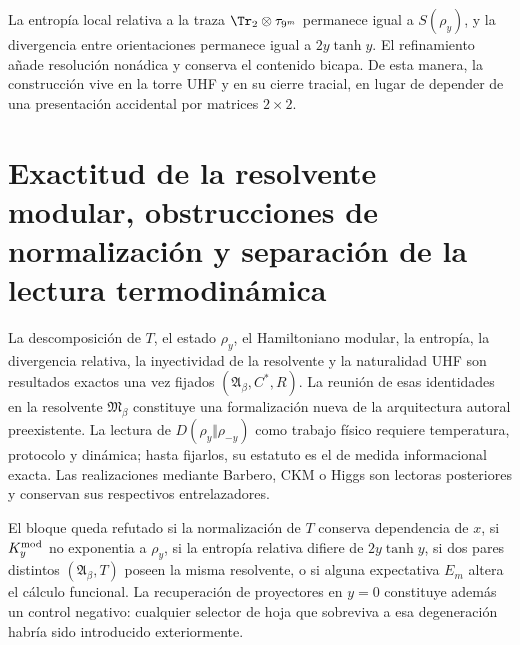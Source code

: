 La entrop\'ia local relativa a la traza
\(\Tr_2\otimes\tau_{9^m}\) permanece igual a
\(S(\rho_y)\), y la divergencia entre orientaciones permanece igual a
\(2y\tanh y\). El refinamiento a\~nade resoluci\'on non\'adica y conserva el
contenido bicapa. De esta manera, la construcci\'on vive en la torre UHF y
en su cierre tracial, en lugar de depender de una presentaci\'on accidental
por matrices \(2\times2\).

\section{Exactitud de la resolvente modular, obstrucciones de normalización y separación de la lectura termodinámica}

\begin{proofstatusbox}
La descomposici\'on de \(T\), el estado \(\rho_y\), el Hamiltoniano modular,
la entrop\'ia, la divergencia relativa, la inyectividad de la resolvente y
la naturalidad UHF son resultados exactos una vez fijados
\((\mathfrak A_\beta,C^*,R)\). La reuni\'on de esas identidades en la
resolvente \(\mathfrak M_\beta\) constituye una formalizaci\'on nueva de la
arquitectura autoral preexistente. La lectura de
\(D(\rho_y\Vert\rho_{-y})\) como trabajo f\'isico requiere temperatura,
protocolo y din\'amica; hasta fijarlos, su estatuto es el de medida
informacional exacta. Las realizaciones mediante Barbero, CKM o Higgs son
lectoras posteriores y conservan sus respectivos entrelazadores.
\end{proofstatusbox}

\begin{falsifierbox}
El bloque queda refutado si la normalizaci\'on de \(T\) conserva dependencia
de \(x\), si \(K_y^{\rm mod}\) no exponentia a \(\rho_y\), si la entrop\'ia
relativa difiere de \(2y\tanh y\), si dos pares distintos
\((\mathfrak A_\beta,T)\) poseen la misma resolvente, o si alguna expectativa
\(E_m\) altera el c\'alculo funcional. La recuperaci\'on de proyectores en
\(y=0\) constituye adem\'as un control negativo: cualquier selector de hoja
que sobreviva a esa degeneraci\'on habr\'ia sido introducido exteriormente.
\end{falsifierbox}
